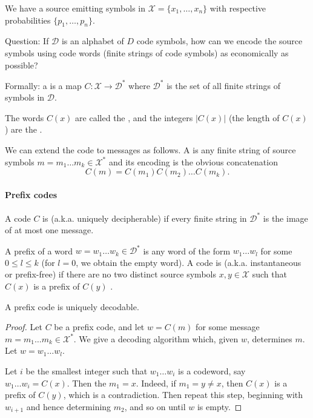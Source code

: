 \documentclass[a4paper, 11pt, openany]{book}
\begin{document}
We have a source emitting symbols in $\mathcal{X} = \{x_1, \dots, x_n\}$ with respective probabilities  $\{p_1, \dots, p_n\}$.


Question: If  $\mathcal{D}$ is an alphabet of  $D$ code symbols, how can we encode the source symbols using code words (finite strings of code symbols) as economically as possible?

Formally: a  is a map $C : \mathcal{X} \to \mathcal{D}^*$
where  $\mathcal{D}^*$     is the set of all finite strings of symbols in  $\mathcal{D}$.

The words $C(x)$ are called the , and the integers $|C(x)|$ (the length of $C(x)$) are the .


We can extend the code to messages as follows. A  is any finite string of source symbols $m = m_1 \dots m_k \in \mathcal{X}^*$ and its encoding is the obvious concatenation
\[
    C(m) = C(m_1) C(m_2) \dots C(m_k).
\]



\paragraph{Prefix codes}


A code $C$ is  (a.k.a. uniquely decipherable) if every finite string in $\mathcal{D}^*$ is the image of at most one message.

A prefix of a word $w = w_1 \dots w_k \in \mathcal{D}^*$ is any word of the form $w_1 \dots w_l$ for some $0 \le l \le k$ (for $l=0$, we obtain the empty word). A code is  (a.k.a. instantaneous or prefix-free) if there are no two distinct source symbols $x, y \in \mathcal{X}$ such that $C(x)$ is a prefix of  $C(y)$         .

\begin{theorem}
A prefix code is uniquely decodable.
\end{theorem}

\begin{proof}
Let $C$ be a prefix code, and let $w = C(m)$ for some message $m = m_1 \dots m_k \in \mathcal{X}^*$. We give a decoding algorithm which, given $w$, determines $m$. Let $w = w_1 \dots w_l$.

Let $i$ be the smallest integer such that $w_1 \dots w_i$ is a codeword, say $w_1 \dots w_i = C(x)$. Then the $m_1 = x$. Indeed, if $m_1 = y \ne x$, then $C(x)$ is a prefix of $C(y)$, which is a contradiction. Then repeat this step, beginning with $w_{i+1}$ and hence determining $m_2$, and so on until $w$ is empty.
\end{proof}
\end{document}

